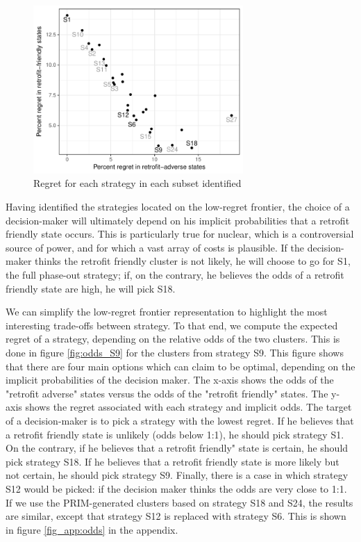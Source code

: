 \begin{figure}[!ht]
	\centering
	\includegraphics[width=8cm]{figures/low_regret_frontier_S9.pdf}
	\caption{Regret for each strategy in each subset identified}
	\label{fig:low_regret_frontier_S9}
\end{figure}

Having identified the strategies located on the low-regret frontier, the choice of a decision-maker will ultimately depend on his implicit probabilities that a retrofit friendly state occurs. 
This is particularly true for nuclear, which is a controversial source of power, and for which a vast array of costs is plausible. 
If the decision-maker thinks the retrofit friendly cluster is not likely, he will choose to go for S1, the full phase-out strategy; if, on the contrary, he believes the odds of a retrofit friendly state are high, he will pick S18. 

We can simplify the low-regret frontier representation to highlight the most interesting trade-offs between strategy. To that end, we compute the expected regret of a strategy, depending on the relative odds of the two clusters. This is done in figure \ref{fig:odds_S9} for the clusters from strategy S9. This figure shows that there are four main options which can claim to be optimal, depending on the implicit probabilities of the decision maker. 
The x-axis shows the odds of the "retrofit adverse" states versus the odds of the "retrofit friendly" states. 
The y-axis shows the regret associated with each strategy and implicit odds. 
The target of a decision-maker is to pick a strategy with the lowest regret. 
If he believes that a retrofit friendly state is unlikely (odds below 1:1), he should pick strategy S1. 
On the contrary, if he believes that a retrofit friendly" state is certain, he should pick strategy S18.
If he believes that a retrofit friendly state is more likely but not certain, he should pick strategy S9.
Finally, there is a case in which strategy S12 would be picked: if the decision maker thinks the odds are very close to 1:1.
If we use the PRIM-generated clusters based on strategy S18 and S24, the results are similar, except that strategy S12 is replaced with strategy S6. This is shown in figure \ref{fig_app:odds} in the appendix.


